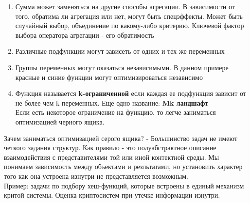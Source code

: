 \begin{enumerate}
    \item Сумма может заменяться на другие способы агрегации. В зависимости от того, обратима ли агрегация или нет, могут быть спецэффекты. Может быть случайный выбор, объединение по какому-либо критерию. Ключевой фактор выбора оператора агрегации - его обратимость
    \item Различные подфункции могут зависеть от одних и тех же переменных
    \item Группы переменных могут оказаться независимыми. В данном примере красные и синие функции могут оптимизироваться независимо\\
    \item Функция называется \textbf{k-ограниченной} если каждая ее подфункция зависит от не более чем k переменных. Еще одно название:\textbf{ Mk ландшафт}\\ Если есть некоторое ограничение на функцию, то легче заниматься оптимизацией черного ящика.
\end{enumerate}
Зачем заниматься оптимизацией серого ящика? - Большинство задач не имеют четкого задания структур. Как правило - это полуабстрактное описание взаимодействия с представителями той или иной контектной среды. Мы понимаем зависимость между объектами и резльтатами, но установить характер того как она устроена изнутри не представляется возможным. \\
Пример: задачи по подбору хеш-функций, которые встроены в единый механизм критой системы. Оценка криптосистем при утечке информации изнутри.
